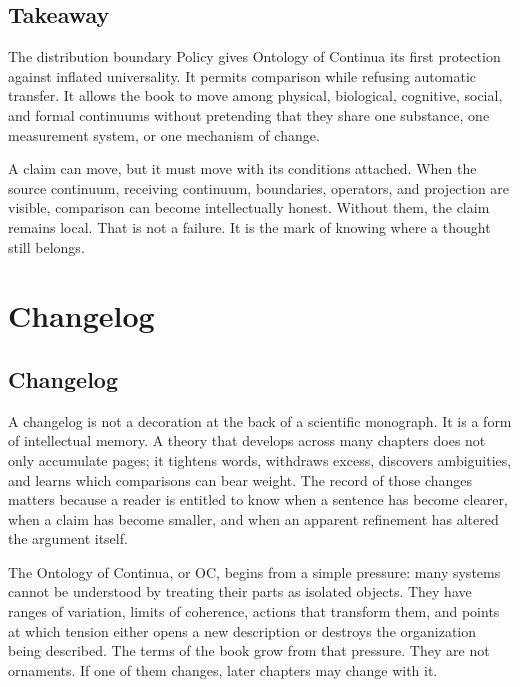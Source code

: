 \documentclass[11pt,a4paper,openany]{book}
\begin{document}
\subsection{Takeaway}
The distribution boundary Policy gives Ontology of Continua its first protection against inflated universality. It permits comparison while refusing automatic transfer. It allows the book to move among physical, biological, cognitive, social, and formal continuums without pretending that they share one substance, one measurement system, or one mechanism of change. \cite{haken_synergetics,nicolis_prigogine_selforg}\par
A claim can move, but it must move with its conditions attached. When the source continuum, receiving continuum, boundaries, operators, and projection are visible, comparison can become intellectually honest. Without them, the claim remains local. That is not a failure. It is the mark of knowing where a thought still belongs.\par
\section{Changelog}
\subsection{Changelog}
A changelog is not a decoration at the back of a scientific monograph. It is a form of intellectual memory. A theory that develops across many chapters does not only accumulate pages; it tightens words, withdraws excess, discovers ambiguities, and learns which comparisons can bear weight. The record of those changes matters because a reader is entitled to know when a sentence has become clearer, when a claim has become smaller, and when an apparent refinement has altered the argument itself. \cite{nicolis_prigogine_selforg,kauffman_autocatalytic}\par
The Ontology of Continua, or OC, begins from a simple pressure: many systems cannot be understood by treating their parts as isolated objects. They have ranges of variation, limits of coherence, actions that transform them, and points at which tension either opens a new description or destroys the organization being described. The terms of the book grow from that pressure. They are not ornaments. If one of them changes, later chapters may change with it.\par
\end{document}
